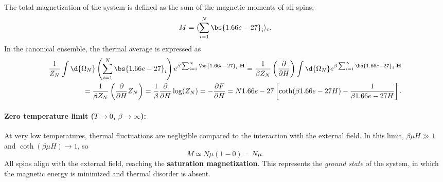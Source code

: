 The total magnetization of the system is defined as the sum of the magnetic moments of all spins:
\begin{equation}
    M = \langle \sum_{i=1}^N \bs{\mu}_i \rangle_c.
    \label{eq:magnetization_definition}
\end{equation}
In the canonical ensemble, the thermal average is expressed as
\[
    \begin{aligned}
        \frac{1}{Z_N} \int \d{\Omega_N} \left( \sum_{i=1}^N \bs{\mu}_i \right) e^{\beta \sum_{i=1}^N \bs{\mu}_i \cdot \mathbf{H}} = \frac{1}{\beta Z_N} \left(\frac{\partial}{\partial H}\right) \int \d{\Omega_N} e^{\beta \sum_{i=1}^N \bs{\mu}_i \cdot \mathbf{H}} \\
        = \frac{1}{\beta Z_N} \left( \frac{\partial}{\partial H} Z_N \right) = \frac{1}{\beta} \frac{\partial}{\partial H} \log(Z_N) = - \frac{\partial F}{\partial H} = N \mu \left[ \coth(\beta \mu H) - \frac{1}{\beta \mu H} \right].
    \end{aligned}
\]

\paragraph{Zero temperature limit ($T \to 0$, $\beta \to \infty$):}
At very low temperatures, thermal fluctuations are negligible compared to the interaction with the external field. In this limit, $\beta \mu H \gg 1$ and $\coth(\beta \mu H) \to 1$, so
\[
    M \simeq N \mu \left( 1 - 0 \right) = N \mu.
\]
All spins align with the external field, reaching the \textbf{saturation magnetization}. This represents the \textit{ground state} of the system, in which the magnetic energy is minimized and thermal disorder is absent.

